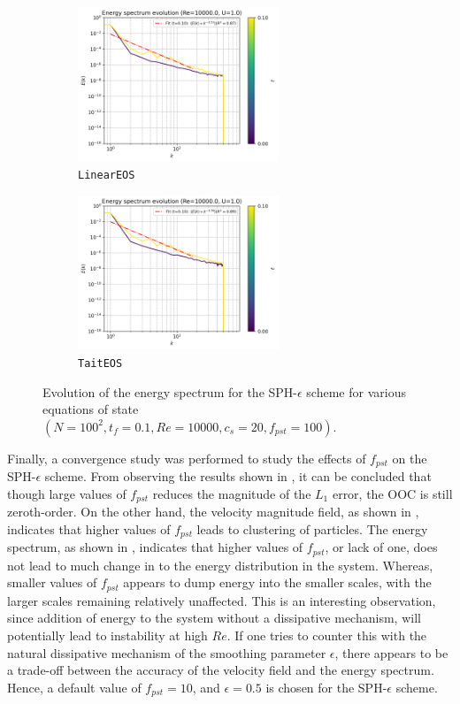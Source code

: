 \begin{figure}[htbp!]
  \begin{subfigure}{7cm}
  \centering\includegraphics[width=6cm]{Code-Figures/mon2017/eos/c0_20_linear_pec_dtmul_1_nx_100_pst_10_re_10000_mon2017/energy_spectrum_evolution.png}
  \caption{\texttt{LinearEOS}}
  \end{subfigure}
  \begin{subfigure}{7cm}
  \centering\includegraphics[width=6cm]{Code-Figures/mon2017/eos/c0_20_tait_pec_dtmul_1_nx_100_pst_10_re_10000_mon2017/energy_spectrum_evolution.png}
  \caption{\texttt{TaitEOS}}
  \end{subfigure}
  \caption{Evolution of the energy spectrum for the SPH-$\epsilon$ scheme for various equations of state $(N=100^2, t_f=0.1, Re=10000, c_s=20, f_{pst}=100)$.}
  \label{fig:sph-eps-eos-espec}
\end{figure}

Finally, a convergence study was performed to study the effects of $f_{pst}$ on the SPH-$\epsilon$ scheme. From observing the results shown in , it can be concluded that though large values of $f_{pst}$ reduces the magnitude of the $L_1$ error, the OOC is still zeroth-order.
On the other hand, the velocity magnitude field, as shown in , indicates that higher values of $f_{pst}$ leads to clustering of particles.
The energy spectrum, as shown in , indicates that higher values of $f_{pst}$, or lack of one, does not lead to much change in to the energy distribution in the system. Whereas, smaller values of $f_{pst}$ appears to dump energy into the smaller scales, with the larger scales remaining relatively unaffected.
This is an interesting observation, since addition of energy to the system without a dissipative mechanism, will potentially lead to instability at high $Re$. If one tries to counter this with the natural dissipative mechanism of the smoothing parameter $\epsilon$, there appears to be a trade-off between the accuracy of the velocity field and the energy spectrum.
Hence, a default value of $f_{pst} = 10$, and $\epsilon = 0.5$ is chosen for the SPH-$\epsilon$ scheme.

